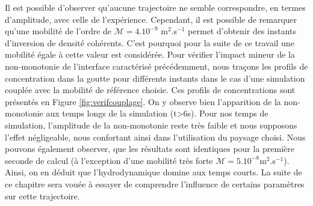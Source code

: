 Il est possible d'observer qu'aucune trajectoire ne semble correspondre, en termes d'amplitude, avec celle de l'expérience. Cependant, il est possible de remarquer qu'une mobilité de l'ordre de $\mathcal{M} = 4.10^{-9}$ m$^2$.s$^{-1}$ permet d'obtenir des instants d'inversion de densité cohérents. C'est pourquoi pour la suite de ce travail une mobilité égale à cette valeur est considérée. Pour vérifier l'impact mineur de la non-monotonie de l'interface caractérisé précédemment, nous traçons les profils de concentration dans la goutte pour différents instants dans le cas d'une simulation couplée avec la mobilité de référence choisie. Ces profils de concentrations sont présentés en Figure \ref{fig:verifcouplage}. On y observe bien l'apparition de la non-monotonie aux temps longs de la simulation (t>6s). Pour nos temps de simulation, l'amplitude de la non-monotonie reste très faible et nous supposons l'effet négligeable, nous confortant ainsi dans l'utilisation du paysage choisi. Nous pouvons également observer, que les résultats sont identiques pour la première seconde de calcul (à l'exception d'une mobilité très forte $\mathcal{M} = 5.10^{-8}$m$^2$.s$^{-1}$). Ainsi, on en déduit que l'hydrodynamique domine aux temps courts. La suite de ce chapitre sera vouée à essayer de comprendre l'influence de certains paramètres sur cette trajectoire.
